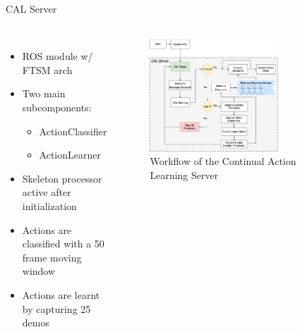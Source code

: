 \documentclass[aspectratio=169, xcolor=dvipsnames]{beamer}
\begin{document}
\begin{frame}{CAL Server}
      \framesubtitle{}%
      
      \begin{columns}
      \vspace{-0.75cm}
      \begin{itemize}
            \item ROS module w/ FTSM arch
            \item Two main subcomponents:
            \begin{itemize}
                  \item \small ActionClassifier
                  \item \small ActionLearner
            \end{itemize}
            \item Skeleton processor active after initialization
            \item Actions are classified with a 50 frame moving window
            \item Actions are learnt by capturing 25 demos
      \end{itemize}

      \vspace{-1.25cm}
      \begin{figure}[ht!]
            \centering
            \includegraphics[width=0.7\textwidth]{images/CAL_workflow.png}
            \caption{Workflow of the Continual Action Learning Server}
      \end{figure}
      \end{columns}      
\end{frame}
\end{document}
